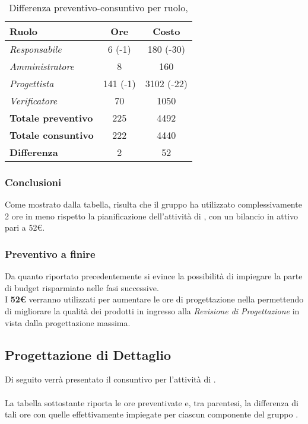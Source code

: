 \begin{table}[H]
	\begin{center}
		\begin{tabular}{|l|c|c|}
			\hline
			\textbf{Ruolo}	& \textbf{Ore} & \textbf{Costo} \\
			\hline
			\textit{Responsabile}		&	6 (-1)	&	180 (-30) 	\\
			\hline
			\textit{Amministratore}		&	8		&	160			\\
			\hline
			\textit{Progettista}		&	141 (-1)&	3102 (-22) 	\\
			\hline
			\textit{Verificatore}		&	70 		&	1050 		\\
			\hline
			\textbf{Totale preventivo}	&	225		& 	4492		\\
			\hline
			\textbf{Totale consuntivo}	&	222		&  	4440		\\
			\hline
			\textbf{Differenza} 		&	2		&	52			\\
			\hline
		\end{tabular}
	\end{center}
	\caption{Differenza preventivo-consuntivo per ruolo, \PA}
\end{table}

\subsubsection{Conclusioni}

Come mostrato dalla tabella, risulta che il gruppo ha utilizzato complessivamente 2 ore in meno rispetto la pianificazione dell'attività di \textit{\PA}, con un bilancio in attivo pari a 52€.

\subsubsection{Preventivo a finire}
Da quanto riportato precedentemente si evince la possibilità di impiegare la parte di budget risparmiato nelle fasi successive. \\
I \textbf{52€} verranno utilizzati per aumentare le ore di progettazione nella \textbf{\PD} permettendo di migliorare la qualità dei prodotti in ingresso alla \textit{Revisione di Progettazione} in vista dalla progettazione massima.

\newpage
\subsection{Progettazione di Dettaglio}
Di seguito verrà presentato il consuntivo per l'attività di \textit{\PD}.
\\\\
La tabella sottostante riporta le ore preventivate e, tra parentesi, la differenza di tali ore con quelle effettivamente impiegate per ciascun componente del gruppo \gruppo.

